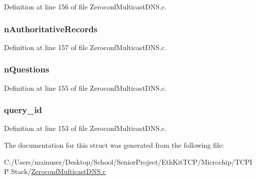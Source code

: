 Definition at line 156 of file Zeroconf\+Multicast\+D\+N\+S.\+c.

\hypertarget{struct___m_d_n_s___m_s_g___h_e_a_d_e_r_aa81791759b0cc35924f97b431c59f859}{}
\subsubsection[{n\+Authoritative\+Records}]{ n\+Authoritative\+Records}\label{struct___m_d_n_s___m_s_g___h_e_a_d_e_r_aa81791759b0cc35924f97b431c59f859}


Definition at line 157 of file Zeroconf\+Multicast\+D\+N\+S.\+c.

\hypertarget{struct___m_d_n_s___m_s_g___h_e_a_d_e_r_a53e1fb5903670425c5e04a26647e4ff8}{}
\subsubsection[{n\+Questions}]{ n\+Questions}\label{struct___m_d_n_s___m_s_g___h_e_a_d_e_r_a53e1fb5903670425c5e04a26647e4ff8}


Definition at line 155 of file Zeroconf\+Multicast\+D\+N\+S.\+c.

\hypertarget{struct___m_d_n_s___m_s_g___h_e_a_d_e_r_ae41711aa22f2e8bc78a863b5d4c25a5a}{}
\subsubsection[{query\+\_\+id}]{ query\+\_\+id}\label{struct___m_d_n_s___m_s_g___h_e_a_d_e_r_ae41711aa22f2e8bc78a863b5d4c25a5a}


Definition at line 153 of file Zeroconf\+Multicast\+D\+N\+S.\+c.



The documentation for this struct was generated from the following file\+:\begin{DoxyCompactItemize}
\item 
C\+:/\+Users/mainuser/\+Desktop/\+School/\+Senior\+Project/\+Eth\+Kit\+T\+C\+P/\+Microchip/\+T\+C\+P\+I\+P Stack/\hyperlink{_zeroconf_multicast_d_n_s_8c}{Zeroconf\+Multicast\+D\+N\+S.\+c}\end{DoxyCompactItemize}
